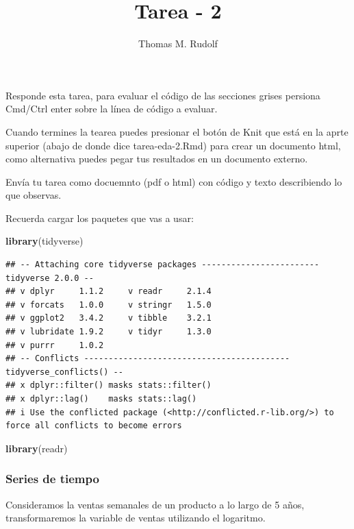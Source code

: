 \documentclass[
]{article}
\title{Tarea - 2}
\author{Thomas M. Rudolf}
\date{}
\newenvironment{Shaded}{\begin{snugshade}}{\end{snugshade}}
\newcommand{\FunctionTok}[1]{\textcolor[rgb]{0.13,0.29,0.53}{\textbf{#1}}}
\newcommand{\NormalTok}[1]{#1}
\begin{document}
\maketitle

Responde esta tarea, para evaluar el código de las secciones grises
persiona Cmd/Ctrl enter sobre la línea de código a evaluar.

Cuando termines la tearea puedes presionar el botón de Knit que está en
la aprte superior (abajo de donde dice tarea-eda-2.Rmd) para crear un
documento html, como alternativa puedes pegar tus resultados en un
documento externo.

Envía tu tarea como docuemnto (pdf o html) con código y texto
describiendo lo que observas.

Recuerda cargar los paquetes que vas a usar:

\begin{Shaded}
\begin{Highlighting}[]
\FunctionTok{library}\NormalTok{(tidyverse)}
\end{Highlighting}
\end{Shaded}

\begin{verbatim}
## -- Attaching core tidyverse packages ------------------------ tidyverse 2.0.0 --
## v dplyr     1.1.2     v readr     2.1.4
## v forcats   1.0.0     v stringr   1.5.0
## v ggplot2   3.4.2     v tibble    3.2.1
## v lubridate 1.9.2     v tidyr     1.3.0
## v purrr     1.0.2     
## -- Conflicts ------------------------------------------ tidyverse_conflicts() --
## x dplyr::filter() masks stats::filter()
## x dplyr::lag()    masks stats::lag()
## i Use the conflicted package (<http://conflicted.r-lib.org/>) to force all conflicts to become errors
\end{verbatim}

\begin{Shaded}
\begin{Highlighting}[]
\FunctionTok{library}\NormalTok{(readr)}
\end{Highlighting}
\end{Shaded}

\hypertarget{series-de-tiempo}{%
\subsubsection{Series de tiempo}\label{series-de-tiempo}}

Consideramos la ventas semanales de un producto a lo largo de 5 años,
transformaremos la variable de ventas utilizando el logaritmo.
\end{document}
